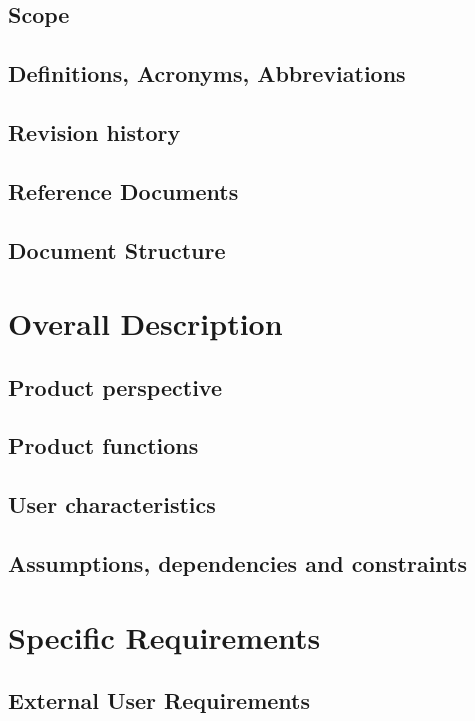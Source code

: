\documentclass[12pt]{article}
\begin{document}
    \subsection{Scope}
        
    \subsection{Definitions, Acronyms, Abbreviations}
    \subsection{Revision history}
    \subsection{Reference Documents}
        
    \subsection{Document Structure}
    
\newpage
\section{Overall Description}
    \subsection{Product perspective}
        
    \subsection{Product functions}
    \subsection{User characteristics}
    \subsection{Assumptions, dependencies and constraints}
    
\newpage
\section{Specific Requirements}
    \subsection{External User Requirements}
\end{document}
